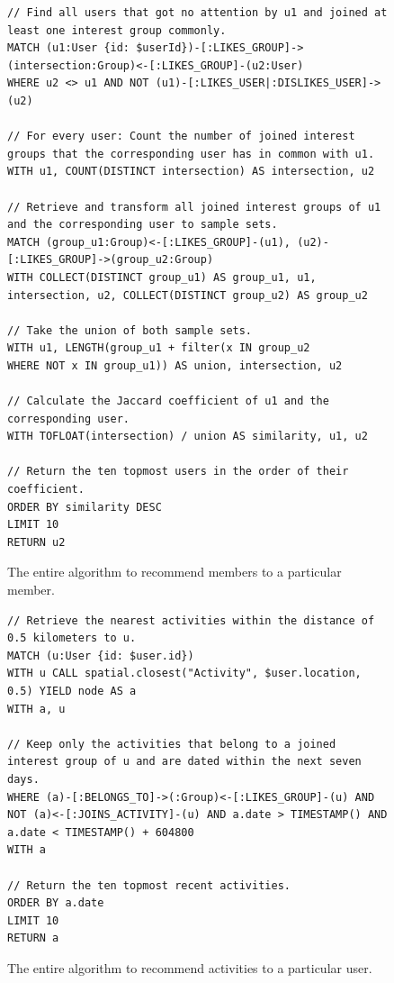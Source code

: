 \documentclass[12pt,numbers=noenddot,parskip,bibliography=totocnumbered,listof=totocnumbered,draft]{scrreprt}
\begin{document}
\begin{figure}
\centering
\begin{lstlisting}
// Find all users that got no attention by u1 and joined at least one interest group commonly.
MATCH (u1:User {id: $userId})-[:LIKES_GROUP]->(intersection:Group)<-[:LIKES_GROUP]-(u2:User) 
WHERE u2 <> u1 AND NOT (u1)-[:LIKES_USER|:DISLIKES_USER]->(u2) 

// For every user: Count the number of joined interest groups that the corresponding user has in common with u1.
WITH u1, COUNT(DISTINCT intersection) AS intersection, u2 

// Retrieve and transform all joined interest groups of u1 and the corresponding user to sample sets.
MATCH (group_u1:Group)<-[:LIKES_GROUP]-(u1), (u2)-[:LIKES_GROUP]->(group_u2:Group) 
WITH COLLECT(DISTINCT group_u1) AS group_u1, u1, intersection, u2, COLLECT(DISTINCT group_u2) AS group_u2 

// Take the union of both sample sets.
WITH u1, LENGTH(group_u1 + filter(x IN group_u2 
WHERE NOT x IN group_u1)) AS union, intersection, u2 

// Calculate the Jaccard coefficient of u1 and the corresponding user. 
WITH TOFLOAT(intersection) / union AS similarity, u1, u2 

// Return the ten topmost users in the order of their coefficient.
ORDER BY similarity DESC 
LIMIT 10
RETURN u2
\end{lstlisting}
\caption[Algorithm to recommend members]{The entire algorithm to recommend members to a particular member.}
\label{recommendationalogirthmmembers}
\end{figure}

\begin{figure}
\centering
\begin{lstlisting}
// Retrieve the nearest activities within the distance of 0.5 kilometers to u.
MATCH (u:User {id: $user.id})
WITH u CALL spatial.closest("Activity", $user.location, 0.5) YIELD node AS a 
WITH a, u 

// Keep only the activities that belong to a joined interest group of u and are dated within the next seven days.
WHERE (a)-[:BELONGS_TO]->(:Group)<-[:LIKES_GROUP]-(u) AND NOT (a)<-[:JOINS_ACTIVITY]-(u) AND a.date > TIMESTAMP() AND a.date < TIMESTAMP() + 604800 
WITH a

// Return the ten topmost recent activities.
ORDER BY a.date 
LIMIT 10
RETURN a
\end{lstlisting}
\caption[Algorithm to recommend activities]{The entire algorithm to recommend activities to a particular user.}
\label{recommendationalogirthmactivities}
\end{figure}
\end{document}
